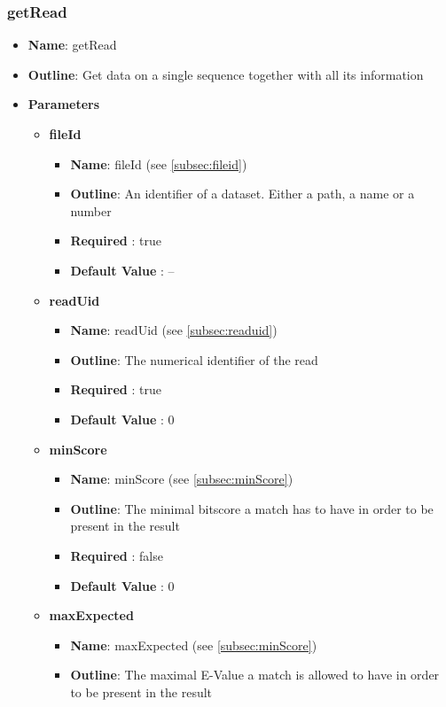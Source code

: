 \documentclass[11pt]{article}
\begin{document}
\subsubsection{getRead}

\begin{itemize}
	\item \textbf{Name}: getRead
	\item \textbf{Outline}: Get data on a single sequence together with all its information
	\item \textbf{Parameters}
		\begin{itemize}
			\item \textbf{fileId}
				\begin{itemize}
					\item \textbf{Name}: fileId (see \ref{subsec:fileid})
					\item \textbf{Outline}: An identifier of a dataset. Either a path, a name or a number
					\item \textbf{Required} : true
					\item \textbf{Default Value} : --
				\end{itemize}
			\item \textbf{readUid}
				\begin{itemize}
					\item \textbf{Name}: readUid (see \ref{subsec:readuid})
					\item \textbf{Outline}: The numerical identifier of the read
					\item \textbf{Required} : true
					\item \textbf{Default Value} : 0
				\end{itemize}
			\item \textbf{minScore}
				\begin{itemize}
					\item \textbf{Name}: minScore (see \ref{subsec:minScore})
					\item \textbf{Outline}: The minimal bitscore a match has to have in order to be present in the result
					\item \textbf{Required} : false
					\item \textbf{Default Value} : 0
				\end{itemize}
			\item \textbf{maxExpected}
				\begin{itemize}
					\item \textbf{Name}: maxExpected (see \ref{subsec:minScore})
					\item \textbf{Outline}: The maximal E-Value a match is allowed to have in order to be present in the result

\end{itemize}
\end{itemize}
\end{itemize}
\end{document}
